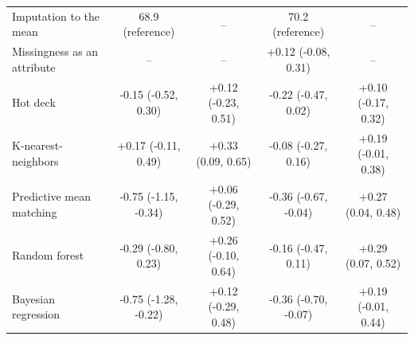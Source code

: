 \documentclass{article}
\begin{document}
\begin{table}
\begin{tabular}{lcccc}
\midrule
Imputation to the mean & 68.9 (reference) & -- & 70.2 (reference) & -- \\ 
Missingness as an attribute & -- & -- & +0.12 (-0.08, 0.31) & -- \\ 
Hot deck & -0.15 (-0.52, 0.30) & +0.12 (-0.23, 0.51) & -0.22 (-0.47, 0.02) & +0.10 (-0.17, 0.32) \\ 
K-nearest-neighbors & +0.17 (-0.11, 0.49) & +0.33 (0.09, 0.65) & -0.08 (-0.27, 0.16) & +0.19 (-0.01, 0.38) \\ 
Predictive mean matching & -0.75 (-1.15, -0.34) & +0.06 (-0.29, 0.52) & -0.36 (-0.67, -0.04) & +0.27 (0.04, 0.48) \\ 
Random forest & -0.29 (-0.80, 0.23) & +0.26 (-0.10, 0.64) & -0.16 (-0.47, 0.11) & +0.29 (0.07, 0.52) \\ 
Bayesian regression & -0.75 (-1.28, -0.22) & +0.12 (-0.29, 0.48) & -0.36 (-0.70, -0.07) & +0.19 (-0.01, 0.44) \\ 
\bottomrule
\end{tabular} 
 \end{table}

\clearpage
\end{document}
